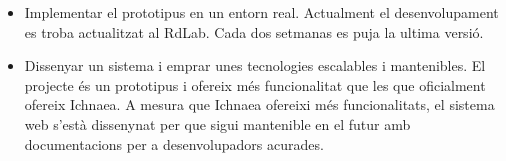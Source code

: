 \begin{itemize}
\item Implementar el prototipus en un entorn real. Actualment el desenvolupament es troba actualitzat al RdLab. Cada dos setmanas es puja la ultima versi\'{o}.
\item Dissenyar un sistema i emprar unes tecnologies escalables i mantenibles. El projecte \'{e}s un prototipus i ofereix m\'{e}s funcionalitat que les que oficialment ofereix Ichnaea. A mesura que Ichnaea ofereixi m\'{e}s funcionalitats, el sistema web s'est\`{a} dissenynat per que sigui mantenible en el futur amb documentacions per a desenvolupadors acurades.
\end{itemize}

